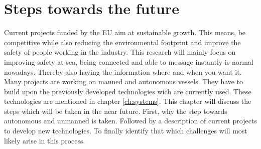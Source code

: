 \chapter{Steps towards the future}
\label{ch:future}
Current projects funded by the EU aim at sustainable growth. This means, be competitive while also reducing the environmental footprint and improve the safety of people working in the industry. \cite{Eriksen2017} \cite{EU2017}
This research will mainly focus on improving safety at sea, being connected and able to message instantly is normal nowadays. Thereby also having the information where and when you want it. Many projects are working on manned and autonomous vessels. They have to build upon the previously developed technologies wich are currently used. These technologies are mentioned in chapter \ref{ch:systems}. This chapter will discuss the steps which will be taken in the near future. First, why the step towards autonomous and unmanned is taken. Followed by a description of current projects to develop new technologies. To finally identify that which challenges will most likely arise in this process.

